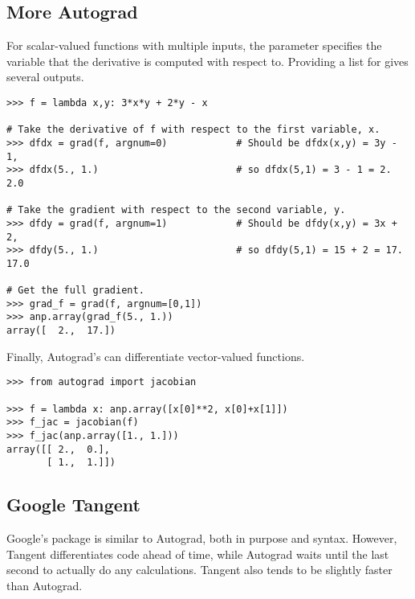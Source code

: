 \subsection*{More Autograd} %

For scalar-valued functions with multiple inputs, the parameter  specifies the variable that the derivative is computed with respect to.
Providing a list for  gives several outputs.

\begin{lstlisting}
>>> f = lambda x,y: 3*x*y + 2*y - x

# Take the derivative of f with respect to the first variable, x.
>>> dfdx = grad(f, argnum=0)            # Should be dfdx(x,y) = 3y - 1,
>>> dfdx(5., 1.)                        # so dfdx(5,1) = 3 - 1 = 2.
2.0

# Take the gradient with respect to the second variable, y.
>>> dfdy = grad(f, argnum=1)            # Should be dfdy(x,y) = 3x + 2,
>>> dfdy(5., 1.)                        # so dfdy(5,1) = 15 + 2 = 17.
17.0

# Get the full gradient.
>>> grad_f = grad(f, argnum=[0,1])
>>> anp.array(grad_f(5., 1.))
array([  2.,  17.])
\end{lstlisting}

Finally, Autograd's  can differentiate vector-valued functions.

\begin{lstlisting}
>>> from autograd import jacobian

>>> f = lambda x: anp.array([x[0]**2, x[0]+x[1]])
>>> f_jac = jacobian(f)
>>> f_jac(anp.array([1., 1.]))
array([[ 2.,  0.],
       [ 1.,  1.]])
\end{lstlisting}

\subsection*{Google Tangent} %

Google's  package is similar to Autograd, both in purpose and syntax.
However, Tangent differentiates code ahead of time, while Autograd waits until the last second to actually do any calculations.
Tangent also tends to be slightly faster than Autograd.

